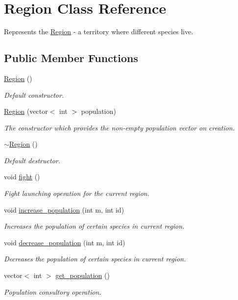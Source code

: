 \hypertarget{class_region}{\section{Region Class Reference}
\label{class_region}
}


Represents the \hyperlink{class_region}{Region} -\/ a territory where different species live.  


\subsection*{Public Member Functions}
\begin{DoxyCompactItemize}
\item 
\hyperlink{class_region_aa8796c9b4ac95da7f7ca4f374673800c}{Region} ()
\begin{DoxyCompactList}\small\item\em Default constructor. \end{DoxyCompactList}\item 
\hyperlink{class_region_ad60199ea545e7ceb0bb1b88b8f0d43f8}{Region} (vector$<$ int $>$ population)
\begin{DoxyCompactList}\small\item\em The constructor which provides the non-\/empty population vector on creation. \end{DoxyCompactList}\item 
\hyperlink{class_region_a3c3670fff78f7511d156e3b2f0bc6266}{$\sim$\-Region} ()
\begin{DoxyCompactList}\small\item\em Default destructor. \end{DoxyCompactList}\item 
void \hyperlink{class_region_a8124ecd078406df4edfb92861c9511e8}{fight} ()
\begin{DoxyCompactList}\small\item\em Fight launching operation for the current region. \end{DoxyCompactList}\item 
void \hyperlink{class_region_af822042e4b63e01b87e483fbabf2987d}{increase\-\_\-population} (int m, int id)
\begin{DoxyCompactList}\small\item\em Increases the population of certain species in current region. \end{DoxyCompactList}\item 
void \hyperlink{class_region_a38a911f9e1034421fd3706064385e4c5}{decrease\-\_\-population} (int m, int id)
\begin{DoxyCompactList}\small\item\em Decreases the population of certain species in current region. \end{DoxyCompactList}\item 
vector$<$ int $>$ \hyperlink{class_region_a76c03f5cb2a0f9941c7b00bbff59e9cb}{get\-\_\-population} ()
\begin{DoxyCompactList}\small\item\em Population consultory operation. \end{DoxyCompactList}\end{DoxyCompactItemize}


